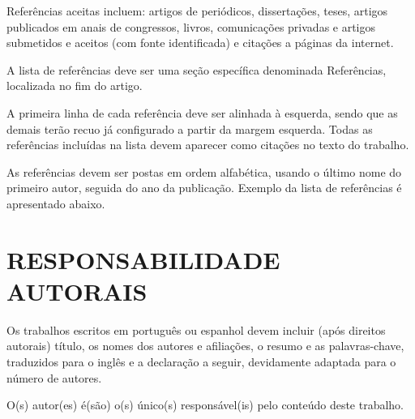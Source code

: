 \documentclass[10pt,fleqn,a4paper,twoside]{article}
\begin{document}
        Referências aceitas incluem: artigos de periódicos, dissertações, teses, artigos publicados em anais de congressos, livros, comunicações privadas e artigos submetidos e aceitos (com fonte identificada) e citações a páginas da internet.

        A lista de referências deve ser uma seção específica denominada Referências, localizada no fim do artigo.

        A primeira linha de cada referência deve ser alinhada à esquerda, sendo que as demais terão recuo já configurado a partir da margem esquerda. Todas as referências incluídas na lista devem aparecer como citações no texto do trabalho.

        As referências devem ser postas em ordem alfabética, usando o último nome do primeiro autor, seguida do ano da publicação. Exemplo da lista de referências é apresentado abaixo.
        
        
        

    \section{RESPONSABILIDADE AUTORAIS}

        Os trabalhos escritos em português ou espanhol devem incluir (após direitos autorais) título, os nomes dos autores e afiliações, o resumo e as palavras-chave, traduzidos para o inglês e a declaração a seguir, devidamente adaptada para o número de autores.
    
        O(s) autor(es) é(são) o(s) único(s) responsável(is) pelo conteúdo deste trabalho.

\end{document}
